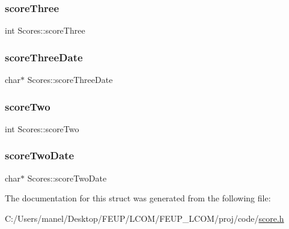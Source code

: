 \mbox{\label{struct_scores_aec915cffa1ccb8645ad6ee54b359f687}} 
\subsubsection{\texorpdfstring{scoreThree}{scoreThree}}
{\footnotesize\ttfamily int Scores\+::score\+Three}

\mbox{\label{struct_scores_a4e480e0715f82dc3e69dbcd87c6290af}} 
\subsubsection{\texorpdfstring{scoreThreeDate}{scoreThreeDate}}
{\footnotesize\ttfamily char$\ast$ Scores\+::score\+Three\+Date}

\mbox{\label{struct_scores_ac138adaf6d9c61b3e6c8ee88915c3c31}} 
\subsubsection{\texorpdfstring{scoreTwo}{scoreTwo}}
{\footnotesize\ttfamily int Scores\+::score\+Two}

\mbox{\label{struct_scores_a6eb8b4bc814ae505d20c5c77c8e19c96}} 
\subsubsection{\texorpdfstring{scoreTwoDate}{scoreTwoDate}}
{\footnotesize\ttfamily char$\ast$ Scores\+::score\+Two\+Date}



The documentation for this struct was generated from the following file\+:\begin{DoxyCompactItemize}
\item 
C\+:/\+Users/manel/\+Desktop/\+F\+E\+U\+P/\+L\+C\+O\+M/\+F\+E\+U\+P\+\_\+\+L\+C\+O\+M/proj/code/\mbox{\hyperlink{score_8h}{score.\+h}}\end{DoxyCompactItemize}
